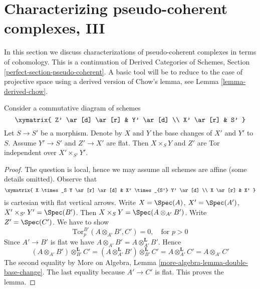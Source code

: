 \section{Characterizing pseudo-coherent complexes, III}
\label{section-characterize-pseudo-coherent}

\noindent
In this section we discuss characterizations of pseudo-coherent complexes
in terms of cohomology. This is a continuation of
Derived Categories of Schemes, Section
\ref{perfect-section-pseudo-coherent}.
A basic tool will be to reduce to the case of projective space
using a derived version of Chow's lemma, see Lemma \ref{lemma-derived-chow}.

\begin{lemma}
\label{lemma-case-of-tor-independence}
Consider a commutative diagram of schemes
$$
\xymatrix{
Z' \ar[d] \ar[r] & Y' \ar[d] \\
X' \ar[r] & S'
}
$$
Let $S \to S'$ be a morphism. Denote by $X$ and $Y$ the base
changes of $X'$ and $Y'$ to $S$.
Assume $Y' \to S'$ and $Z' \to X'$ are flat.
Then $X \times_S Y$ and $Z'$ are Tor independent over $X' \times_{S'} Y'$.
\end{lemma}

\begin{proof}
The question is local, hence we may assume all schemes are affine
(some details omitted). Observe that
$$
\xymatrix{
X \times_S Y \ar[r] \ar[d] & X' \times_{S'} Y' \ar[d] \\
X \ar[r] & X'
}
$$
is cartesian with flat vertical arrows.
Write $X = \Spec(A)$, $X' = \Spec(A')$,
$X' \times_{S'} Y' = \Spec(B')$. Then
$X \times_S Y = \Spec(A \otimes_{A'} B')$.
Write $Z' = \Spec(C')$. We have to show
$$
\text{Tor}_p^{B'}(A \otimes_{A'} B', C') = 0,
\quad\text{for } p > 0
$$
Since $A' \to B'$ is flat
we have $A \otimes_{A'} B' = A \otimes_{A'}^\mathbf{L} B'$.
Hence
$$
(A \otimes_{A'} B') \otimes_{B'}^\mathbf{L} C' =
(A \otimes_{A'}^\mathbf{L} B') \otimes_{B'}^\mathbf{L} C' =
A \otimes_{A'}^\mathbf{L} C' =
A \otimes_{A'} C'
$$
The second equality by More on Algebra, Lemma
\ref{more-algebra-lemma-double-base-change}.
The last equality because $A' \to C'$ is flat. This proves the lemma.
\end{proof}

